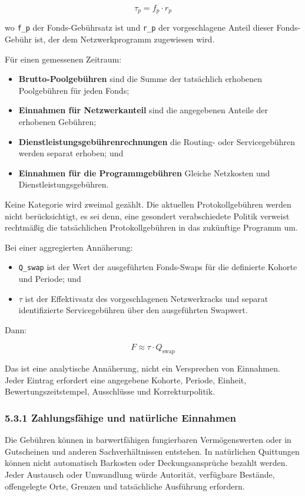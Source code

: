 \documentclass[11pt]{article}
\begin{document}
\[
\tau_p = f_p \cdot r_p
\]

wo \texttt{f\_p} der Fonds-Gebührsatz ist und \texttt{r\_p} der vorgeschlagene Anteil dieser Fonds-Gebühr ist, der dem Netzwerkprogramm zugewiesen wird.

Für einen gemessenen Zeitraum:

\begin{itemize}[leftmargin=*]
\item \textbf{Brutto-Poolgebühren} sind die Summe der tatsächlich erhobenen Poolgebühren für jeden Fonds;
\item \textbf{Einnahmen für Netzwerkanteil} sind die angegebenen Anteile der erhobenen Gebühren;
\item \textbf{Dienstleistungsgebührenrechnungen} die Routing- oder Servicegebühren werden separat erhoben; und
\item \textbf{Einnahmen für die Programmgebühren} Gleiche Netzkosten und Dienstleistungsgebühren.
\end{itemize}
Keine Kategorie wird zweimal gezählt. Die aktuellen Protokollgebühren werden nicht berücksichtigt, es sei denn, eine gesondert verabschiedete Politik verweist rechtmäßig die tatsächlichen Protokollgebühren in das zukünftige Programm um.

Bei einer aggregierten Annäherung:

\begin{itemize}[leftmargin=*]
\item \texttt{Q\_swap} ist der Wert der ausgeführten Fonds-Swaps für die definierte Kohorte und Periode; und
\item \texttt{$\tau$} ist der Effektivsatz des vorgeschlagenen Netzwerkracks und separat identifizierte Servicegebühren über den ausgeführten Swapwert.
\end{itemize}
Dann:

\[
F \approx \tau \cdot Q_{\mathrm{swap}}
\]

Das ist eine analytische Annäherung, nicht ein Versprechen von Einnahmen. Jeder Eintrag erfordert eine angegebene Kohorte, Periode, Einheit, Bewertungszeitstempel, Ausschlüsse und Korrekturpolitik.

\subsubsection*{5.3.1 Zahlungsfähige und natürliche Einnahmen}

Die Gebühren können in barwertfähigen fungierbaren Vermögenswerten oder in Gutscheinen und anderen Sachverhältnissen entstehen. In natürlichen Quittungen können nicht automatisch Barkosten oder Deckungsansprüche bezahlt werden. Jeder Austausch oder Umwandlung würde Autorität, verfügbare Bestände, offengelegte Orte, Grenzen und tatsächliche Ausführung erfordern.
\end{document}
